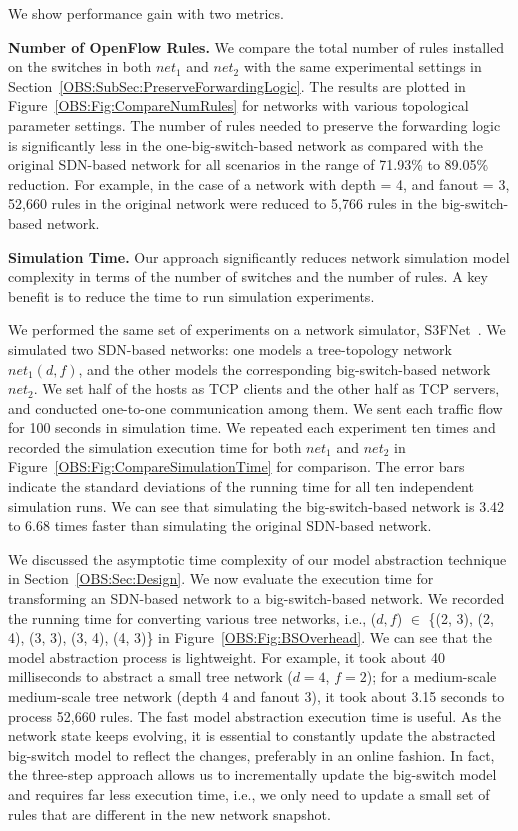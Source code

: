 We show performance gain with two metrics.

\textbf{Number of OpenFlow Rules.} We compare the total number of rules installed
on the switches in both $net_1$ and $net_2$ with the same experimental settings
in Section~\ref{OBS:SubSec:PreserveForwardingLogic}.
The results are plotted in Figure~\ref{OBS:Fig:CompareNumRules} for networks with
various topological parameter settings.
The number of rules needed to preserve the forwarding logic is significantly
less in the one-big-switch-based network as compared with the original SDN-based network
for all scenarios in the range of 71.93\% to 89.05\% reduction.
For example, in the case of a network with depth = 4, and fanout = 3, 52,660 rules
in the original network were reduced to 5,766 rules in the big-switch-based network.


\textbf{Simulation Time.}
Our approach significantly reduces network simulation model complexity in terms of
the number of switches and the number of rules.
A key benefit is to reduce the time to run simulation experiments.

We performed the same set of experiments on a network simulator, S3FNet~\cite{S3F}.
We simulated two SDN-based networks: one models a tree-topology network $net_1(d, f)$,
and the other models the corresponding big-switch-based network $net_2$.
We set half of the hosts as TCP clients and the other half as TCP servers,
and conducted one-to-one communication among them.
We sent each traffic flow for 100 seconds in simulation time.
We repeated each experiment ten times and recorded the simulation execution time for both $net_1$ and $net_2$ in
Figure~\ref{OBS:Fig:CompareSimulationTime} for comparison.
The error bars indicate the standard deviations of the running time
for all ten independent simulation runs.
We can see that simulating the big-switch-based network is 3.42 to 6.68 times
faster than simulating the original SDN-based network.


We discussed the asymptotic time complexity of our model abstraction technique in 
Section~\ref{OBS:Sec:Design}.
We now evaluate the execution time for transforming an SDN-based network to a big-switch-based network.
We recorded the running time for converting various tree networks,
i.e., ($d, f$) $\in$ \{(2, 3), (2, 4), (3, 3), (3, 4), (4, 3)\} in Figure~\ref{OBS:Fig:BSOverhead}.
We can see that the model abstraction process is lightweight.
For example, it took about 40 milliseconds to abstract a small tree network ($d=4$, $f=2$);
for a medium-scale medium-scale tree network (depth 4 and fanout 3),
it took about 3.15 seconds to process 52,660 rules.
The fast model abstraction execution time is useful.
As the network state keeps evolving, it is essential to constantly update the abstracted big-switch model to reflect the changes, preferably in an online fashion.
In fact, the three-step approach allows us to incrementally update the big-switch model and requires far less execution time, i.e.,
we only need to update a small set of rules that are different in the new network snapshot.

